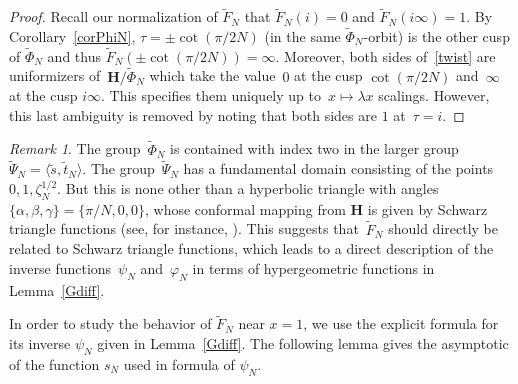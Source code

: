 \documentclass[10pt]{amsart}
\def\SSS{\S}
\renewcommand\setminus{\smallsetminus}
\def\wPhi{\widetilde{\Phi}}
\def\wwPhi{\widetilde{\Psi}}
\def\wF{\widetilde{F}}
\def\ws{\widetilde{s}}
\def\wt{\widetilde{t}}
\newtheorem{lemma}[subsubsection]{Lemma}
\theoremstyle{remark}
\newtheorem{remark}[subsubsection]{Remark}
\numberwithin{equation}{subsection}
\def\C{\mathbf{C}}
\def\H{\mathbf{H}}
\begin{document}
\begin{proof}
Recall our normalization of $\wF_N$ that $\wF_N(i)=0$ and $\wF_N(i \infty)=1$. By Corollary~\ref{corPhiN}, $\tau=\pm \cot(\pi/2N)$ (in the same $\wPhi_N$-orbit) is the other cusp of $\wPhi_N$ and thus $\wF_N(\pm \cot(\pi/2N))=\infty$. Moreover,
both sides of~\eqref{twist} are uniformizers of~$\H/\wPhi_N$ which take the value~$0$ at the cusp $\cot(\pi/2N)$ and~$\infty$ at the cusp $i\infty$.
This specifies them uniquely up to~$x \mapsto \lambda x$ scalings. However, this last ambiguity is
removed by noting that both sides are $1$ at~$\tau = i$.
\end{proof}




\begin{remark}
The group~$\wPhi_N$ is contained with index two in the larger group~$\wwPhi_N = \langle \ws,\wt_N \rangle$.
The group~$\wwPhi_N$ has a fundamental domain consisting of the points~$0,1,\zeta_N^{1/2}$.
But this is none other than
a  hyperbolic triangle with angles~$\{\alpha,\beta,\gamma\} = \{\pi/N,0,0\}$, whose conformal mapping from $\H$ is given by Schwarz triangle functions (see, for instance, \cite[\SSS~404 on page~185]{Caratheodory}).
This suggests that~$\wF_N$ should directly be related to Schwarz triangle functions,
which leads to a direct description of the inverse functions~$\psi_N$ and~$\varphi_N$
in terms of hypergeometric functions in Lemma~\ref{Gdiff}.
\end{remark}


In order to study the behavior of $\wF_N$ near $x=1$, we use the explicit formula for its inverse $\psi_N$ given in Lemma~\ref{Gdiff}. The following lemma gives the asymptotic of the function $s_N$ used in formula of $\psi_N$.

\end{document}
